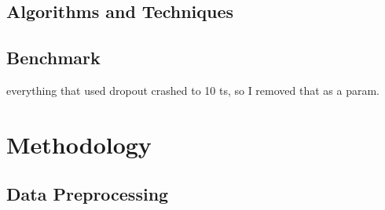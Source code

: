 \documentclass[12pt,a4paper]{article}
\begin{document}
\subsection*{Algorithms and Techniques}
%
\subsection*{Benchmark}
%


everything that used dropout crashed to 10 ts, so I removed that as a param.

\section{Methodology}
%
\subsection*{Data Preprocessing}
%
\end{document}
